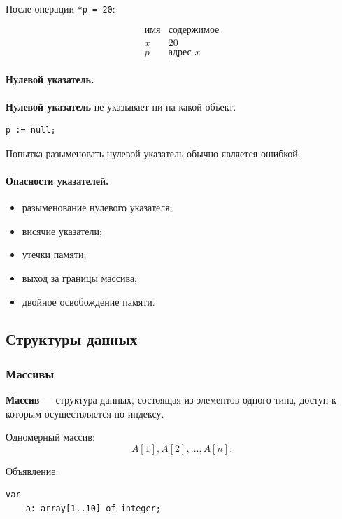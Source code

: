 \documentclass[12pt,a4paper]{article}
\begin{document}
После операции \texttt{*p = 20}:

\[
\begin{array}{c|c}
\text{имя} & \text{содержимое}\\
\hline
x & 20\\
p & \text{адрес } x
\end{array}
\]

\paragraph{Нулевой указатель.}

\textbf{Нулевой указатель} не указывает ни на какой объект.

\begin{verbatim}
p := null;
\end{verbatim}

Попытка разыменовать нулевой указатель обычно является ошибкой.

\paragraph{Опасности указателей.}

\begin{itemize}
    \item разыменование нулевого указателя;
    \item висячие указатели;
    \item утечки памяти;
    \item выход за границы массива;
    \item двойное освобождение памяти.
\end{itemize}

\subsection{Структуры данных}

\subsubsection{Массивы}

\textbf{Массив} --- структура данных, состоящая из элементов одного типа, доступ к которым осуществляется по индексу.

Одномерный массив:
\[
    A[1], A[2], \dots, A[n].
\]

Объявление:

\begin{verbatim}
var
    a: array[1..10] of integer;
\end{verbatim}
\end{document}
